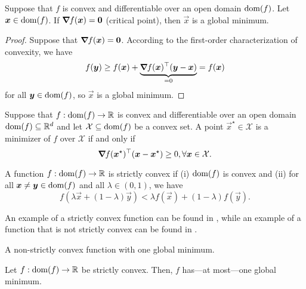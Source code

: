 \begin{lemma}
    \label{lem:conv-global-min}

    Suppose that $f$ is convex and differentiable over an open domain $\mathrm{dom}(f)$. Let $\bm{x}\in\mathrm{dom}(f)$. If $\bm{\nabla}_{\! } f(\bm{x}) = \bm{0}$ (critical point), then $\vec{x}$ is a global minimum.
\end{lemma}

\begin{proof}
    Suppose that $\bm{\nabla}_{\! } f(\bm{x}) = \bm{0}$. According to the first-order characterization of convexity, we have \[
        f(\bm{y}) \geq f(\bm{x}) + \underbrace{\bm{\nabla}_{\! } f(\bm{x})^\top (\bm{y}-\bm{x})}_{=0} = f(\bm{x})
    \]
    for all $\bm{y} \in \mathrm{dom}(f)$, so $\vec{x}$ is a global minimum.
\end{proof}

\begin{lemma}
    \label{lem:optim}

    Suppose that $f: \mathrm{dom}(f) \to \mathbb{R}$ is convex and differentiable over an open domain $\mathrm{dom}(f)
        \subseteq \mathbb{R}^d$ and let $\mathcal{X} \subseteq \mathrm{dom}(f)$ be a convex set. A point $\vec{x}^\star \in
        \mathcal{X}$ is a minimizer of $f$ over $\mathcal{X}$ if and only if \[
        \bm{\nabla}_{\! } f(\bm{x}^\star)^\top(\bm{x} - \bm{x}^\star) \geq 0, \forall \bm{x} \in \mathcal{X}.
    \]
\end{lemma}

\begin{definition}
    A function $f: \mathrm{dom}(f)\to \mathbb{R}$ is strictly convex if (i) $\mathrm{dom}(f)$ is convex and (ii) for all $\bm{x} \neq \bm{y}\in \mathrm{dom}(f)$ and all $\lambda\in(0,1)$, we have \[
        f(\lambda \vec{x} + (1-\lambda) \vec{y}) < \lambda f(\vec{x}) + (1-\lambda) f(\vec{y}).
    \]
\end{definition}

An example of a strictly convex function can be found in , while an example of
a function that is not strictly convex can be found in .

\begin{marginfigure}
    \centering
    \caption{A non-strictly convex function with one global minimum.}
    \label{fig:non-strict-convexity}
\end{marginfigure}

\begin{lemma}
    Let $f: \mathrm{dom}(f) \to \mathbb{R}$ be strictly convex. Then, $f$ has---at most---one global minimum.
\end{lemma}

